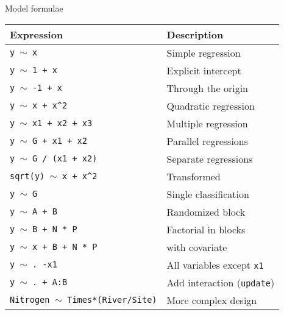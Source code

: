 
\begin{frame}
  Model formulae\\
  \begin{center}
    \begin{footnotesize}
      \begin{tabular}{ll}
        \hline
        Expression & Description \\
        \hline
        \texttt{y }$\sim$\texttt{ x}                         & Simple regression \\
        \texttt{y }$\sim$\texttt{ 1 + x}                     & Explicit intercept \\
        \texttt{y }$\sim$\texttt{ -1 + x}                    & Through the origin \\
        \texttt{y }$\sim$\texttt{ x + x\^{ }2}               & Quadratic regression \\
        \texttt{y }$\sim$\texttt{ x1 + x2 + x3}              & Multiple regression \\
        \texttt{y }$\sim$\texttt{ G + x1 + x2}               & Parallel regressions \\
        \texttt{y }$\sim$\texttt{ G / (x1 + x2)}             & Separate regressions \\
        \texttt{sqrt(y) }$\sim$\texttt{ x + x\^{ }2}         & Transformed \\
        \texttt{y }$\sim$\texttt{ G}                         & Single classification \\
        \texttt{y }$\sim$\texttt{ A + B}                     & Randomized block \\
        \texttt{y }$\sim$\texttt{ B + N * P}                 & Factorial in blocks \\
        \texttt{y }$\sim$\texttt{ x + B + N * P}             & with covariate \\
        \texttt{y }$\sim$\texttt{ . -x1}                     & All variables except \texttt{x1} \\
        \texttt{y }$\sim$\texttt{ . + A:B}                   & Add interaction (\texttt{update}) \\
        \texttt{Nitrogen }$\sim$\texttt{ Times*(River/Site)} & More complex design \\ 
        \hline
      \end{tabular}   
    \end{footnotesize}
  \end{center}
\end{frame}

